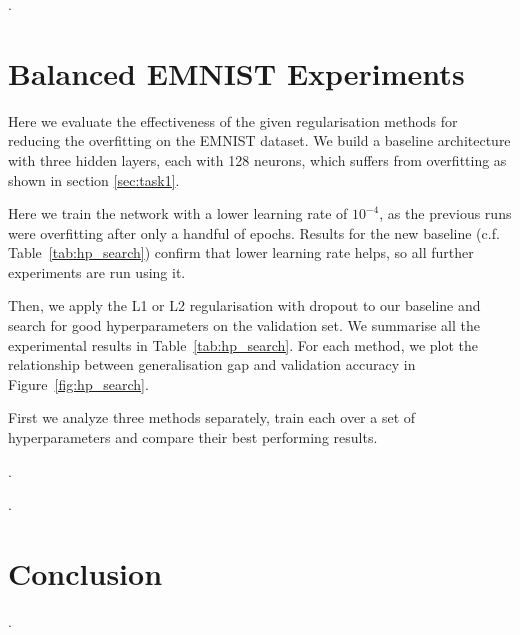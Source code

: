 \documentclass{article}
\begin{document}
\questionTwelve.


\section{Balanced EMNIST Experiments}

\questionTableThree

\questionFigureFour

\label{sec:task2.2}

Here we evaluate the effectiveness of the given regularisation methods for reducing the overfitting on the EMNIST dataset.
We build a baseline architecture with three hidden layers, each with 128 neurons, which suffers from overfitting as shown in section \ref{sec:task1}.

Here we train the network with a lower learning rate of $10^{-4}$, as the previous runs were overfitting after only a handful of epochs. 
Results for the new baseline (c.f. Table~\ref{tab:hp_search}) confirm that lower learning rate helps, so all further experiments are run using it.

Then, we apply the L1 or L2 regularisation with dropout to our baseline and search for good hyperparameters on the validation set. 
We summarise all the experimental results in Table~\ref{tab:hp_search}. For each method, we plot the relationship between generalisation gap and validation accuracy in Figure~\ref{fig:hp_search}.

First we analyze three methods separately, train each over a set of hyperparameters and compare their best performing results.

\questionThirteen.

\questionFourteen.


\section{Conclusion}
\label{sec:concl}
    
\questionFifteen.

\newpage

\end{document}
